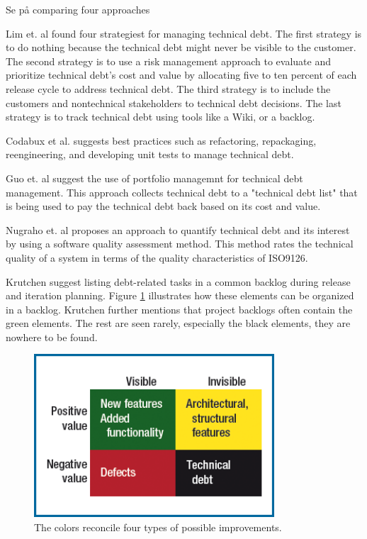 Se på comparing four approaches

Lim et. al found four strategiest for managing technical debt. The first strategy is to do nothing because the technical debt might never be visible to the customer. The second strategy is to use a risk management approach to evaluate and prioritize technical debt's cost and value by allocating five to ten percent of each release cycle to address technical debt. The third strategy is to include the customers and nontechnical stakeholders to technical debt decisions. The last strategy is to track technical debt using tools like a Wiki, or a backlog.

Codabux et al. suggests best practices such as refactoring, repackaging, reengineering, and developing unit tests to manage technical debt.

Guo et. al suggest the use of portfolio managemnt for technical debt management. This approach collects technical debt to a "technical debt list" that is being used to pay the technical debt back based on its cost and value.

Nugraho et. al proposes an approach to quantify technical debt and its interest by using a software quality assessment method. This method rates the technical quality of a system in terms of the quality characteristics of ISO9126. 

Krutchen suggest listing debt-related tasks in a common backlog during release and iteration planning. Figure \ref{fig:fourColorBacklog} illustrates how these elements can be organized in a backlog. Krutchen further mentions that project backlogs often contain the green elements. The rest are seen rarely, especially the black elements, they are nowhere to be found.

\begin{figure}[ht!]
	\centering
	\includegraphics[width=0.8\textwidth]{images/fourColorBacklog.png}
	\caption{The colors reconcile four types of possible improvements.}
	\label{fig:fourColorBacklog}
\end{figure}



